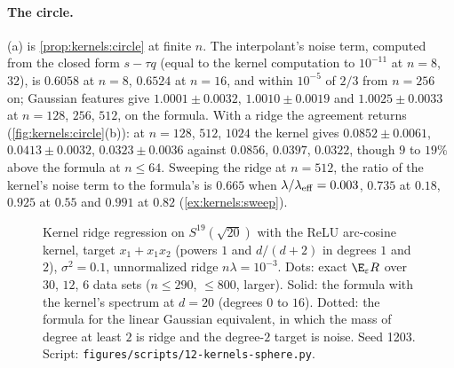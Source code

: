 \begin{refsection}
\paragraph{The circle.} (a) is \cref{prop:kernels:circle} at finite $n$. The interpolant's noise term, computed from the closed form $s-\tau q$ (equal to the kernel computation to $10^{-11}$ at $n=8$, $32$), is $0.6058$ at $n=8$, $0.6524$ at $n=16$, and within $10^{-5}$ of $2/3$ from $n=256$ on; Gaussian features give $1.0001\pm0.0032$, $1.0010\pm0.0019$ and $1.0025\pm0.0033$ at $n=128$, $256$, $512$, on the formula. With a ridge the agreement returns (\cref{fig:kernels:circle}(b)): at $n=128$, $512$, $1024$ the kernel gives $0.0852\pm0.0061$, $0.0413\pm0.0032$, $0.0323\pm0.0036$ against $0.0856$, $0.0397$, $0.0322$, though $9$ to $19\%$ above the formula at $n\le64$. Sweeping the ridge at $n=512$, the ratio of the kernel's noise term to the formula's is $0.665$ when $\lambda/\lambda_{\mathrm{eff}}=0.003$, $0.735$ at $0.18$, $0.925$ at $0.55$ and $0.991$ at $0.82$ (\cref{ex:kernels:sweep}).

\begin{figure}[t]
\centering
{}
\caption{Kernel ridge regression on $S^{19}(\sqrt{20})$ with the ReLU arc-cosine kernel, target $x_1+x_1x_2$ (powers $1$ and $d/(d+2)$ in degrees $1$ and $2$), $\sigma^2=0.1$, unnormalized ridge $n\lambda=10^{-3}$. Dots: exact $\E_\varepsilon R$ over $30$, $12$, $6$ data sets ($n\le290$, $\le800$, larger). Solid: the formula with the kernel's spectrum at $d=20$ (degrees $0$ to $16$). Dotted: the formula for the linear Gaussian equivalent, in which the mass of degree at least $2$ is ridge and the degree-$2$ target is noise. Seed 1203. Script: \texttt{figures/scripts/12-kernels-sphere.py}.}\label{fig:kernels:sphere}
\end{figure}


\end{refsection}
